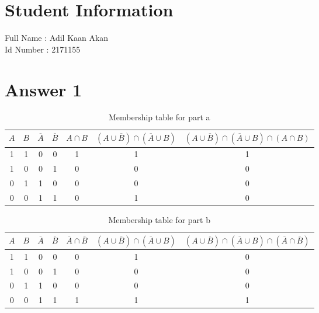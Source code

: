 \documentclass[12pt]{article}
\begin{document}
\section*{Student Information } 
Full Name :  Adil Kaan Akan\\
Id Number :  2171155\\

\section*{Answer 1}
\begin{table}[H]
\small
\centering
\caption{ Membership table for part a}
\label{table:example}
\begin{tabular}{|c|c|c|c|c|c|c|}	
\hline 							
\textbf{$A$} & \textbf{$B$} & \textbf{$\overline{A}$} & \textbf{$\overline{B}$} & \textbf{$A\cap B$} & \textbf{$(A \cup \overline{B})\cap(\overline{A} \cup B)$}& \textbf{$(A \cup \overline{B})\cap(\overline{A} \cup B) \cap (A\cap B)$}\\
\hline 
\hline 
1 & 1 & 0 & 0 & 1 & 1 & 1\\			
1 & 0 & 0 & 1 & 0 & 0 & 0\\
0 & 1 & 1 & 0 & 0 & 0 & 0\\
0 & 0 & 1 & 1 & 0 & 1 & 0\\
\hline 

\end{tabular}
\end{table}

\begin{table}[H]
\small
\centering
\caption{ Membership table for part b}
\label{table:example}
\begin{tabular}{|c|c|c|c|c|c|c|}	
\hline 							
\textbf{$A$} & \textbf{$B$} & \textbf{$\overline{A}$} & \textbf{$\overline{B}$} & \textbf{$\overline{A} \cap \overline{B}$} & \textbf{$(A \cup \overline{B})\cap(\overline{A} \cup B)$} & \textbf{$(A \cup \overline{B})\cap(\overline{A} \cup B) \cap (\overline{A} \cap \overline{B})$} \\
\hline 
\hline 
1 & 1 & 0 & 0 & 0 & 1 & 0\\			
1 & 0 & 0 & 1 & 0 & 0 & 0\\
0 & 1 & 1 & 0 & 0 & 0 & 0\\
0 & 0 & 1 & 1 & 1 & 1 & 1\\
\hline 

\end{tabular}
\end{table}
\end{document}
